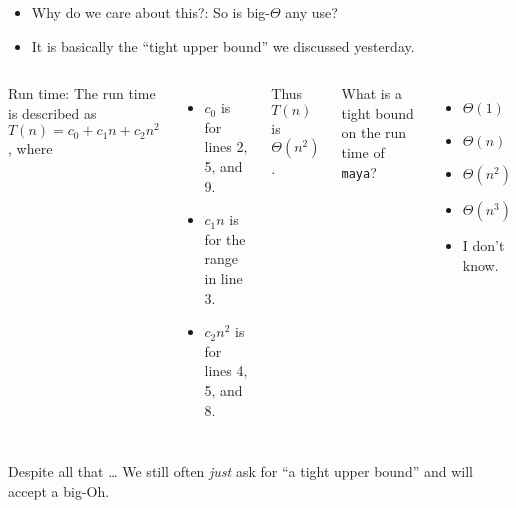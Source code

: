 \begin{frame}
	\begin{itemize}
	\item Why do we care about this?:	So is big-$\Theta$ any use?
\item It is basically the ``tight upper bound'' we discussed yesterday.
	\end{itemize}

			\begin{columns}
				
					
Run time:
						The run time is described as $T(n) = c_0 + c_1n + c_2n^2$, where
						\begin{itemize}
							\item $c_0$ is for lines 2, 5, and 9.
							\item $c_1n$ is for the range in line 3.
							\item $c_2n^2$ is for lines 4, 5, and 8.
						\end{itemize}
						Thus $T(n)$ is $\Theta(n^2)$.

						What is a tight bound on the run time of \texttt{maya}?
						\begin{itemize}
						\small
							\item $\Theta(1)$
							\item $\Theta(n)$
							\item $\Theta(n^2)$
							\item $\Theta(n^3)$
							\item I don't know.
						\end{itemize}
			\end{columns}

Despite all that \ldots
					We still often \textit{just} ask for ``a tight upper bound'' and will accept a big-Oh.

\end{frame}


